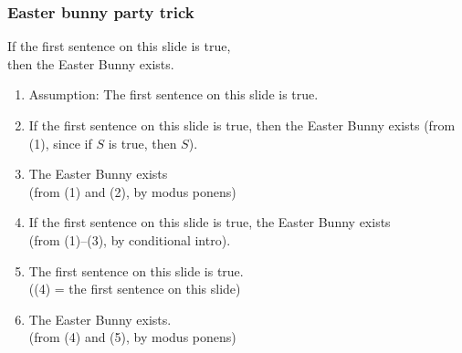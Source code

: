 \begin{frame}
\frametitle{Easter bunny party trick}
\small
If the first sentence on this slide is true, \\\qquad then the Easter Bunny exists.

\begin{enumerate}[<+->]
\item Assumption: The first sentence on this slide is true.
\item If the first sentence on this slide is true, then  the Easter Bunny exists (from (1), since if $S$ is true, then $S$).
\item The Easter Bunny exists \\\qquad(from (1) and (2), by modus ponens)
\item If the first sentence on this slide is true,  the Easter Bunny exists\\\qquad(from (1)--(3), by conditional intro).
\item The first sentence on this slide is true.\\\qquad ((4) = the first sentence on this slide)
\item The Easter Bunny exists.\\\qquad (from (4) and (5), by modus ponens)
\end{enumerate}
\end{frame}

